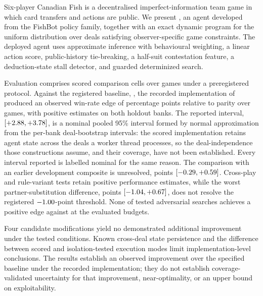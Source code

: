Six-player Canadian Fish is a decentralised imperfect-information team game in which card transfers
and actions are public. We present \sestina{}, an agent developed from the FishBot policy family,
together with an exact dynamic program for the uniform distribution over deals satisfying
observer-specific game constraints. The deployed agent uses approximate inference with behavioural
weighting, a linear action score, public-history tie-breaking, a half-suit contestation feature, a
deduction-state stall detector, and guarded determinized search.

Evaluation comprises \vsevenScoredCells{} scored comparison cells over \vsevenScoredGames{} games
under a preregistered protocol. Against the registered baseline, \fcheap{}, the recorded
implementation of \sestina{} produced an observed win-rate edge of \vsevenBtwoFcheap{} percentage
points relative to parity over \vsevenBtwoFcheapN{} games, with positive estimates on both holdout
banks. The reported interval, $[+2.88, +3.78]$, is a nominal pooled
95\% interval formed by normal approximation from the per-bank deal-bootstrap intervals: the scored
implementation retains agent state across the deals a worker thread processes, so the
deal-independence those constructions assume, and their coverage, have not been established. Every
interval reported is labelled nominal for the same reason. The
comparison with an earlier development composite is unresolved, \vsevenBtwoComposite{} points
$[-0.29, +0.59]$. Cross-play and rule-variant tests retain
positive performance estimates, while the worst partner-substitution difference, \vsevenSoneMin{}
points $[-1.04, +0.67]$, does not resolve the registered
$-1.00{}$-point threshold. None of \vsevenBfourArmsWord{} tested adversarial searches
achieves a positive edge against \sestina{} at the evaluated budgets.

Four candidate modifications yield no demonstrated additional improvement under the tested
conditions. Known cross-deal state persistence and the difference between scored and
isolation-tested execution modes limit implementation-level conclusions. The results establish an
observed improvement over the specified baseline under the recorded implementation; they do not
establish coverage-validated uncertainty for that improvement, near-optimality, or an upper bound on
exploitability.
